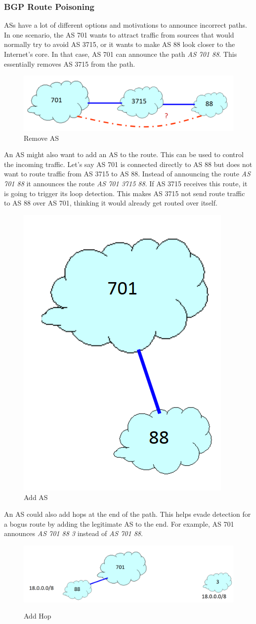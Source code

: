 \subsubsection{BGP Route Poisoning}
ASs have a lot of different options and motivations to announce incorrect paths. In one scenario, the AS 701 wants to attract traffic from sources that would normally try to avoid AS 3715, or it wants to make AS 88 look closer to the Internet's core. In that case, AS 701 can announce the path \textit{AS 701 88}. This essentially removes AS 3715 from the path.
\begin{figure}[H]
\centering
\includegraphics[width=.6\textwidth]{images/remove_AS.PNG}
\caption{Remove AS}
\label{remove_AS}
\end{figure}

An AS might also want to add an AS to the route. This can be used to control the incoming traffic. Let's say AS 701 is connected directly to AS 88 but does not want to route traffic from AS 3715 to AS 88. Instead of announcing the route \textit{AS 701 88} it announces the route \textit{AS 701 3715 88}. If AS 3715 receives this route, it is going to trigger its loop detection. This makes AS 3715 not send route traffic to AS 88 over AS 701, thinking it would already get routed over itself.
\begin{figure}[H]
\centering
\includegraphics[width=.3\textwidth]{images/add_AS.PNG}
\caption{Add AS}
\label{add_as}
\end{figure}

An AS could also add hops at the end of the path. This helps evade detection for a bogus route by adding the legitimate AS to the end. For example, AS 701 announces \textit{AS 701 88 3} instead of \textit{AS 701 88}.
\begin{figure}[H]
\centering
\includegraphics[width=.8\textwidth]{images/add_hop.PNG}
\label{add_hop}
\caption{Add Hop}
\end{figure}

